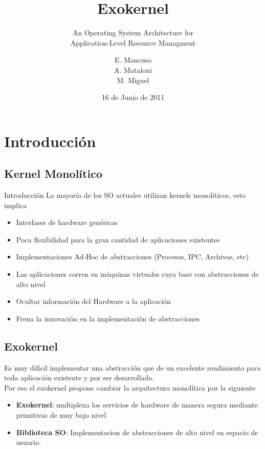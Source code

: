 \documentclass[10pt]{beamer}
\title{Exokernel}
\subtitle{An Operating System Architecture for \\  Application-Level Resource Managment}
\author{E. Mancuso\\ A. Mataloni\\ M. Miguel }
\date{16 de Junio de 2011}
\begin{document}
 \begin{frame}
  \titlepage
 \end{frame}
 \begin{frame}
  \tableofcontents
 \end{frame}
\section{Introducción}
\subsection{Kernel Monolítico}
\begin{frame}{Introducción}
La mayoría de los SO actuales utilizan kernels monolíticos, esto implica

\begin{itemize}
  \item Interfases de hardware genéricas
  \item Poca flexibilidad para la gran cantidad de aplicaciones existentes
  \item Implementaciones Ad-Hoc de abstracciones (Procesos, IPC, Archivos, etc)
  \item Las aplicaciones corren en máquinas virtuales cuya base con abstracciones de alto nivel
  \item Ocultar información del Hardware a la aplicación
  \item Frena la innovación en la implementación de abstracciones
\end{itemize}
\end{frame}

\subsection{Exokernel}
\begin{frame}

Es muy difícil implementar una abstracción que de un excelente rendimiento para toda aplicación existente y por ser desarrollada.\\[1em]

Por eso el exokernel propone cambiar la arquitectura monolítica por la siguiente \\[1em]

\begin{itemize}
  \item \textbf{Exokernel}: multiplexa los servicios de hardware de manera segura mediante primitivas de muy bajo nivel
  \item \textbf{Biblioteca SO}: Implementacion de abstracciones de alto nivel en espacio de usuario.
\end{itemize}
\end{frame}
\end{document}

